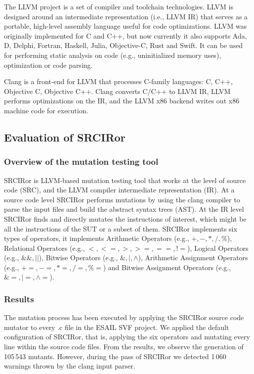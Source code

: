 The LLVM project is a set of compiler and toolchain technologies. LLVM is designed around an intermediate representation (i.e., LLVM IR) that serves as a portable, high-level assembly language useful for code optimizations. LLVM was originally implemented for C and C++, but now currently it also supports Ada, D, Delphi, Fortran, Haskell, Julia, Objective-C, Rust and Swift. It can be used for performing static analysis on code (e.g., uninitialized memory uses), optimization or code parsing.

Clang is a front-end for LLVM that processes C-family languages: C, C++, Objective C, Objective C++. Clang converts C/C++ to LLVM IR, LLVM performs optimizations on the IR, and the LLVM x86 backend writes out x86 machine code for execution.

\subsection{Evaluation of SRCIRor}
\label{subsec:srciror}

\subsubsection{Overview of the mutation testing tool}

SRCIRor is LLVM-based mutation testing tool that works at the level of source code (SRC), and the LLVM compiler intermediate representation (IR). 
At a source code level SRCIRor performs mutations by using the clang compiler to parse the input files and build the abstract syntax trees (AST). 
At the IR level SRCIRor finds and directly mutates the instructions of interest, which might be all the instructions of the SUT or a subset of them. 
SRCIRor implements six types of operators, it implements Arithmetic Operators (e.g., $+, -, *, /, \%$), Relational Operators (e.g., $<, <=, >, >=, ==, !=$), Logical Operators (e.g., $\&\&, ||$), Bitwise Operators (e.g., $\&, |, \wedge$), Arithmetic Assignment Operators (e.g., $+=, -=, *=, /=, \%=$) and Bitwise Assignment Operators (e.g., $\&=, |=, \wedge=$).

\subsubsection{Results}

The mutation process has been executed by applying the SRCIRor source code mutator to every .c file in the ESAIL SVF project. We applied the default configuration of SRCIRor, that is, applying the six operators and mutating every line within the source code files.
From the results, we observe the generation of 105\,543 mutants. However, during the pass of SRCIRor we detected 1\,060 warnings thrown by the clang input parser.

